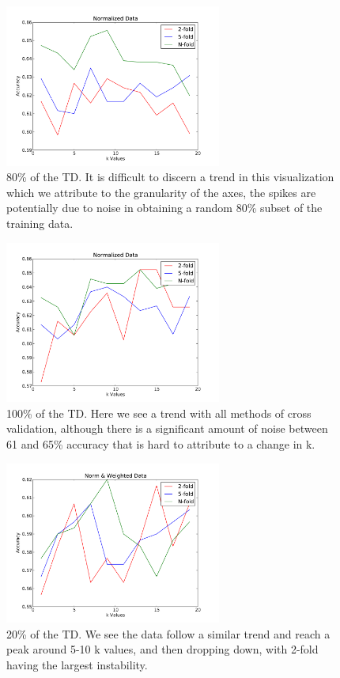\documentclass[conference]{acmsiggraph}
\begin{document}
\begin{figure}[h]
  \centering
  \includegraphics[width=2.8in]{images/alc_n_80.pdf}
  \caption{80\% of the TD. It is difficult to discern a trend in this visualization which we attribute to the granularity of the axes, the spikes are potentially due to noise in obtaining a random 80\% subset of the training data.}
\end{figure}

\begin{figure}[h]
  \centering
  \includegraphics[width=2.8in]{images/alc_n_100.pdf}
  \caption{100\% of the TD. Here we see a trend with all methods of cross validation, although there is a significant amount of noise between 61 and 65\% accuracy that is hard to attribute to a change in k.}
\end{figure}

\begin{figure}[h]
  \centering
  \includegraphics[width=2.8in]{images/alc_nw_20.pdf}
  \caption{20\% of the TD. We see the data follow a similar trend and reach a peak around 5-10 k values, and then dropping down, with 2-fold having the largest instability.}
\end{figure}
\end{document}
